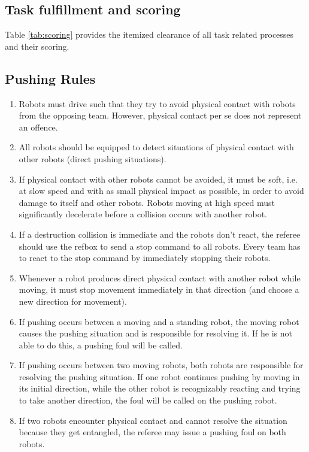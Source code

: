 \documentclass[12pt,twoside]{article}
\begin{document}
\subsection{Task fulfillment and scoring}
Table \ref{tab:scoring} provides the itemized clearance of all task
related processes and their scoring.


\subsection{Pushing Rules}
\begin{enumerate}
	\item Robots must drive such that they try to avoid physical contact with robots from the opposing team. However, physical contact per se does not represent an offence.
	\item All robots should be equipped to detect situations of physical contact with other robots (direct pushing situations).
	\item If physical contact with other robots cannot be avoided, it must be soft, i.e. at slow speed and with as small physical impact as possible, in order to avoid damage to itself and other robots. Robots moving at high speed must significantly decelerate before a collision occurs with another robot.
	\item If a destruction collision is immediate and the robots don't react, the referee should use the refbox to send a stop command to all robots. Every team has to react to the stop command by immediately stopping their robots.
	\item Whenever a robot produces direct physical contact with another robot while moving, it must stop movement immediately in that direction (and choose a new direction for movement).
	\item If pushing occurs between a moving and a standing robot, the moving robot causes the pushing situation and is responsible for resolving it. If he is not able to do this, a pushing foul will be called.
	\item If pushing occurs between two moving robots, both robots are responsible for resolving the pushing situation. If one robot continues pushing by moving in its initial direction, while the other robot is recognizably reacting and trying to take another direction, the foul will be called on the pushing robot.
	\item If two robots encounter physical contact and cannot resolve the situation because they get entangled, the referee may issue a pushing foul on both robots.

\end{enumerate}
\end{document}
